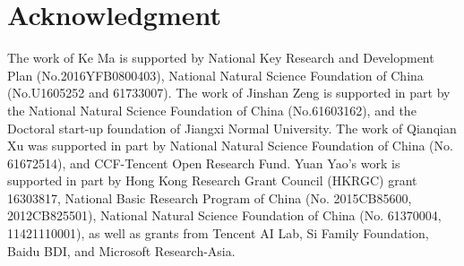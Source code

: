 \documentclass[letterpaper]{article} %
\begin{document}

\section*{Acknowledgment}
The work of Ke Ma is supported by National Key Research and Development Plan (No.2016YFB0800403), National Natural Science Foundation of China (No.U1605252 and 61733007). The work of Jinshan Zeng is supported in part by the National Natural Science Foundation of China (No.61603162), and the Doctoral start-up foundation of Jiangxi Normal University. The work of Qianqian Xu was supported in part by National Natural Science Foundation of China (No. 61672514), and CCF-Tencent Open Research Fund. Yuan Yao's work is supported in part by Hong Kong Research Grant Council (HKRGC) grant 16303817, National Basic Research Program of China (No. 2015CB85600, 2012CB825501), National Natural Science Foundation of China (No. 61370004, 11421110001), as well as grants from Tencent AI Lab, Si Family Foundation, Baidu BDI, and Microsoft Research-Asia. %



									
%
\end{document}
